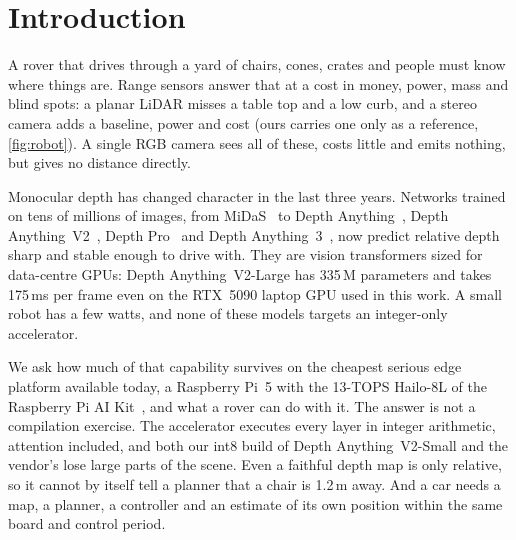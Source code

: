 \documentclass[conference]{IEEEtran}
\newcommand{\hailo}{Hailo-8L}
\newcommand{\rpi}{Raspberry Pi~5}
\newcommand{\dav}{Depth Anything~V2}
\begin{document}
\section{Introduction}
A rover that drives through a yard of chairs, cones, crates and people must know where things are. Range sensors answer
that at a cost in money, power, mass and blind spots: a planar LiDAR misses a table top and a low curb, and a stereo
camera adds a baseline, power and cost (ours carries one only as a reference, \cref{fig:robot}). A single RGB camera sees all
of these, costs little and emits nothing, but gives no distance directly.

Monocular depth has changed character in the last three years. Networks trained on tens of millions of images, from
MiDaS~\cite{ranftl2022midas} to Depth Anything~\cite{yang2024da1}, \dav{}~\cite{yang2024dav2}, Depth
Pro~\cite{bochkovskiy2025depthpro} and Depth Anything~3~\cite{lin2025da3}, now predict relative depth sharp and stable enough
to drive with. They are vision transformers sized for data-centre GPUs: \dav-Large has 335\,M parameters and takes 175\,ms per
frame even on the RTX~5090 laptop GPU used in this work. A small robot has a few watts, and none of these models targets an
integer-only accelerator.

We ask how much of that capability survives on the cheapest serious edge platform available today, a \rpi{} with the
13-TOPS \hailo{} of the Raspberry Pi AI Kit~\cite{rpi2024aikit}, and what a rover can do with it. The answer is not a
compilation exercise. The accelerator executes every layer in integer arithmetic, attention included, and both our int8
build of \dav-Small and the vendor's lose large parts of the scene. Even a faithful depth map is only relative, so it
cannot by itself tell a planner that a chair is 1.2\,m away. And a car needs a map, a planner, a controller and an estimate
of its own position within the same board and control period.
\end{document}
